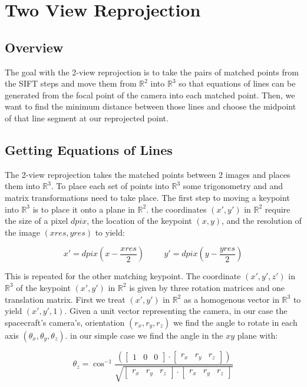 \chapter{Two View Reprojection}

\section{Overview}
The goal with the 2-view reprojection is to take the pairs of matched points from the SIFT steps and
move them from $\mathbb{R}^{2}$ into $\mathbb{R}^{3}$ so that equations of lines can be generated from the
focal point of the camera into each matched point. Then, we want to find the minimum distance between those
lines and choose the midpoint of that line segment at our reprojected point.

\section{Getting Equations of Lines}
The 2-view reprojection takes the matched points between 2 images and places them into $\mathbb{R}^{3}$.
To place each set of points into $\mathbb{R}^{3}$ some trigonometry and and matrix transformations need to take place.
The first step to moving a keypoint into $\mathbb{R}^{3}$ is to place it onto a plane in $\mathbb{R}^{2}$.
the coordinates $(x', y')$ in $\mathbb{R}^{2}$ require the size of a pixel $dpix$, the location of the keypoint $(x, y)$,
and the resolution of the image $(xres, yres)$ to yield:

\[
x' = dpix(x - \frac{xres}{2})\hspace{1cm} y' = dpix(y - \frac{yres}{2})
\label{test}
\]

This is repeated for the other matching keypoint. The coordinate $(x', y', z')$ in $\mathbb{R}^{3}$ of
the keypoint $(x', y')$ in $\mathbb{R}^{2}$ is given by three rotation matrices and one translation matrix.
First we treat $(x', y')$ in $\mathbb{R}^{2}$ as a homogenous vector in $\mathbb{R}^{3}$ to yield $(x', y', 1)$.
Given a unit vector representing the camera, in our case the spacecraft’s
camera’s, orientation $(r_x,r_y,r_z)$ we find the angle to rotate in each axis $(\theta_x,\theta_y,\theta_z)$.
in our simple case we find the angle in the $xy$ plane with:

\[
\theta_z = \cos^{-1} \frac{ (\begin{bmatrix}1 & 0 & 0\end{bmatrix} \cdot \begin{bmatrix}r_x & r_y & r_z \end{bmatrix}) }{ \sqrt{ \begin{bmatrix}r_x & r_y & r_z\end{bmatrix} \cdot \begin{bmatrix}r_x & r_y & r_z\end{bmatrix} } }
\]

